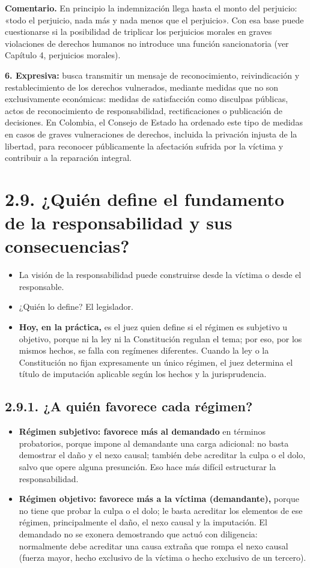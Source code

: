 \begin{comentario}
\textcolor[HTML]{8A6D3B}{\textbf{Comentario. }}En principio la indemnización llega hasta el monto del perjuicio: «todo el perjuicio, nada más y nada menos que el perjuicio». Con esa base puede cuestionarse si la posibilidad de triplicar los perjuicios morales en graves violaciones de derechos humanos no introduce una función sancionatoria (ver Capítulo 4, perjuicios morales).
\end{comentario}
\textbf{6. Expresiva:} busca transmitir un mensaje de reconocimiento, reivindicación y restablecimiento de los derechos vulnerados, mediante medidas que no son exclusivamente económicas: medidas de satisfacción como disculpas públicas, actos de reconocimiento de responsabilidad, rectificaciones o publicación de decisiones. En Colombia, el Consejo de Estado ha ordenado este tipo de medidas en casos de graves vulneraciones de derechos, incluida la privación injusta de la libertad, para reconocer públicamente la afectación sufrida por la víctima y contribuir a la reparación integral.

\section{2.9. ¿Quién define el fundamento de la responsabilidad y sus consecuencias?}
\begin{itemize}
\item La visión de la responsabilidad puede construirse desde la víctima o desde el responsable.
\item ¿Quién lo define? El legislador.
\item \textbf{Hoy, en la práctica,} es el juez quien define si el régimen es subjetivo u objetivo, porque ni la ley ni la Constitución regulan el tema; por eso, por los mismos hechos, se falla con regímenes diferentes. Cuando la ley o la Constitución no fijan expresamente un único régimen, el juez determina el título de imputación aplicable según los hechos y la jurisprudencia.
\end{itemize}
\subsection{2.9.1. ¿A quién favorece cada régimen?}
\begin{itemize}
\item \textbf{Régimen subjetivo: favorece más al demandado} en términos probatorios, porque impone al demandante una carga adicional: no basta demostrar el daño y el nexo causal; también debe acreditar la culpa o el dolo, salvo que opere alguna presunción. Eso hace más difícil estructurar la responsabilidad.
\item \textbf{Régimen objetivo: favorece más a la víctima (demandante),} porque no tiene que probar la culpa o el dolo; le basta acreditar los elementos de ese régimen, principalmente el daño, el nexo causal y la imputación. El demandado no se exonera demostrando que actuó con diligencia: normalmente debe acreditar una causa extraña que rompa el nexo causal (fuerza mayor, hecho exclusivo de la víctima o hecho exclusivo de un tercero).
\end{itemize}
